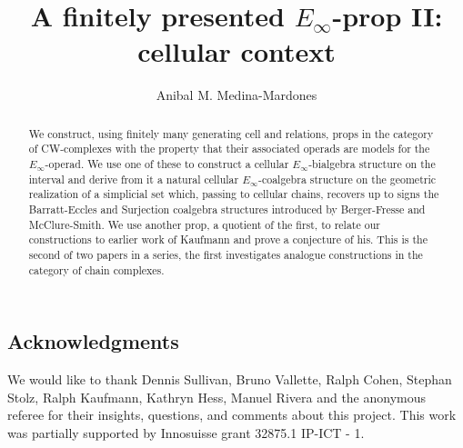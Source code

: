\documentclass{higherStructures}
\newcommand{\1}{\mathbf{1}}
\theoremstyle{definition}
\begin{document}
	
\title{A finitely presented $E_\infty$-prop II: cellular context}
\author{Anibal M. Medina-Mardones}
\address{Department of Mathematics, University of Notre Dame, Notre Dame, IN 46556, United States}
\address{Max Planck Institute for Mathematics, Bonn, 53111, Germany}

\maketitle

\begin{abstract}
	We construct, using finitely many generating cell and relations, props in the category of CW-complexes with the property that their associated operads are models for the $E_\infty$-operad. We use one of these to construct a cellular $E_\infty$-bialgebra structure on the interval and derive from it a natural cellular $E_\infty$-coalgebra structure on the geometric realization of a simplicial set which, passing to cellular chains, recovers up to signs the Barratt-Eccles and Surjection coalgebra structures introduced by Berger-Fresse and McClure-Smith. We use another prop, a quotient of the first, to relate our constructions to earlier work of Kaufmann and prove a conjecture of his. This is the second of two papers in a series, the first investigates analogue constructions in the category of chain complexes.
\end{abstract}



\subsection*{Acknowledgments} 

We would like to thank Dennis Sullivan, Bruno Vallette, Ralph Cohen, Stephan Stolz, Ralph Kaufmann, Kathryn Hess, Manuel Rivera and the anonymous referee for their insights, questions, and comments about this project.
This work was partially supported by Innosuisse grant 32875.1 IP-ICT - 1.



	
\end{document}
